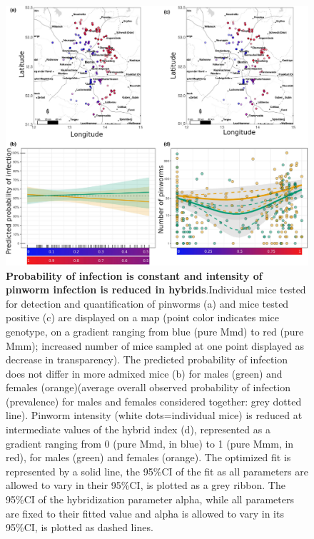 \begin{figure}[H]
    \centering
    \includegraphics[width=\linewidth,height=\textheight,keepaspectratio]{images/2article1/Figure3.pdf}
    \caption{\textbf{Probability of infection is constant and intensity of pinworm infection is reduced in hybrids}.Individual mice tested for detection and quantification of pinworms (a) and mice tested positive (c) are displayed on a map (point color indicates mice genotype, on a gradient ranging from blue (pure Mmd) to red (pure Mmm); increased number of mice sampled at one point displayed as decrease in transparency). The predicted probability of infection does not differ in more admixed mice (b) for males (green) and females (orange)(average overall observed probability of infection (prevalence) for males and females considered together: grey dotted line). Pinworm intensity (white dots=individual mice) is reduced at intermediate values of the hybrid index (d), represented as a gradient ranging from 0 (pure Mmd, in blue) to 1 (pure Mmm, in red), for males (green) and females (orange). The optimized fit is represented by a solid line, the 95\%CI of the fit as all parameters are allowed to vary in their 95\%CI, is plotted as a grey ribbon. The 95\%CI of the hybridization parameter alpha, while all parameters are fixed to their fitted value and alpha is allowed to vary in its 95\%CI, is plotted as dashed lines.}
\end{figure}

